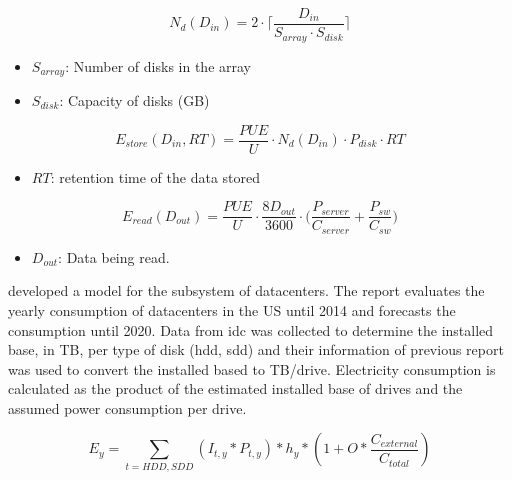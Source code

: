 \begin{equation}
\label{formula:tall_datacenter_ndisks}
    N_d(D_{in}) = 2 \cdot \bigg \lceil \frac{D_{in}}{S_{array} \cdot S_{disk}} \bigg \rceil
\end{equation}

\begin{itemize}
    \item $S_{array}$: Number of disks in the array
    \item $S_{disk}$: Capacity of disks (GB)
\end{itemize}

\begin{equation}
\label{formula:tall_datacenter_store}
    E_{store}(D_{in}, RT) = \frac{PUE}{U} \cdot N_d(D_{in}) \cdot P_{disk} \cdot RT
\end{equation}

\begin{itemize}
    \item $RT$: retention time of the data stored
\end{itemize}

\begin{equation}
\label{formula:tall_datacenter_read}
    E_{read}(D_{out}) = \frac{PUE}{U} \cdot \frac{8D_{out}}{3600} \cdot \bigg(\frac{P_{server}}{C_{server}} + \frac{P_{sw}}{C_{sw}}  \bigg)
\end{equation}

\begin{itemize}
    \item $D_{out}$: Data being read.
\end{itemize}


\citet{USReport2016} developed a model for the subsystem of datacenters. The report evaluates the yearly consumption of datacenters in the US until 2014 and forecasts the consumption until 2020. Data from \ac{idc} was collected to determine the installed base, in \ac{TB}, per type of disk (\ac{hdd}, \ac{sdd}) and their information of previous report \citet{USReport2007} was used to convert the installed based to \ac{TB}/drive.
Electricity consumption is calculated as the product of the estimated installed base of drives and the assumed power consumption per drive.

\begin{equation}
\label{formula:usreport2016}
    E_y = \sum_{t=HDD,SDD}{(I_{t,y} * P_{t,y}) * h_y * (1 + O * \frac{C_{external}}{C_{total}})}
\end{equation}


